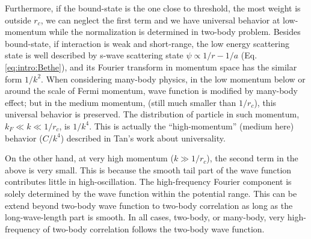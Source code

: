 Furthermore, if the bound-state is the one close to threshold, the most weight is outside $r_{c}$, we can neglect the first term and we have universal behavior at low-momentum while the normalization is determined in two-body problem.   Besides  bound-state, if interaction is weak and short-range, the low energy scattering state is well described by s-wave scattering state $\psi\propto1/r-1/a$ (Eq. \ref{eq:intro:Bethe}), and its Fourier transform in momentum space has the similar form $1/k^{2}$.  When considering many-body physics, in the low momentum below or around the scale of Fermi momentum,  wave function  is modified by many-body effect; but in the medium momentum, (still much smaller than $1/r_{c}$), this universal behavior is preserved.  The distribution of particle in such momentum, $k_{F}\ll{k}\ll{1/r_{c}}$, is $1/k^{4}$. This is actually the ``high-momentum'' (medium here) behavior ($C/k^{4}$) described in Tan's work about universality\cite{Tan2008-1,Tan2008-2}. 

On the other hand, at very high momentum ($k\gg1/r_{c}$), the second term in the above is very small.  This is because the smooth tail part of the wave function contributes little in high-oscillation.  The high-frequency Fourier component is solely determined by the wave function within the potential range.   This can be extend beyond two-body wave function to two-body correlation as long as the long-wave-length part is smooth.  In all cases, two-body, or many-body, very high-frequency of two-body correlation follows the two-body wave function.  





